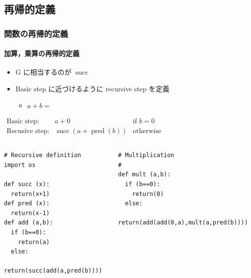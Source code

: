 \subsection{再帰的定義}
\begin{frame}
\frametitle{関数の再帰的定義}
\framesubtitle{加算，乗算の再帰的定義}
   \begin{itemize}
\item G に相当するのが \(\operatorname{succ}\)
\item Basic step に近づけるように recursive step を定義
     \begin{itemize}
\item \(a+b=\)
     \end{itemize}
  \end{itemize}
\vspace{-1em}
  \begin{center}
  \begin{math}
    \begin{array}{lll}
\mbox{Basic step:}& a+0 & \mbox{if }b=0 \\
\mbox{Recusive step:}& \operatorname{succ}(a+\operatorname{pred}(b)) & \mbox{otherwise}
    \end{array}
  \end{math}  
  \end{center}
\vspace{-2em}
  \begin{columns}
    \begin{column}[t]{0.4\textwidth}
      \begin{lstlisting}[caption={加算},label=add-rec]
# Recursive definition
import os

def succ (x):
  return(x+1)
def pred (x):
  return(x-1)
def add (a,b):
  if (b==0):
    return(a)
  else:
    return(succ(add(a,pred(b))))
      \end{lstlisting}
    \end{column}
    \begin{column}[t]{0.55\textwidth}
      \begin{lstlisting}[firstnumber=13,caption={乗算},label=mult-rec]
# Multiplication
#
def mult (a,b):
  if (b==0):
    return(0)
  else:
    return(add(add(0,a),mult(a,pred(b))))
      \end{lstlisting}
    \end{column}
  \end{columns}
\end{frame}
